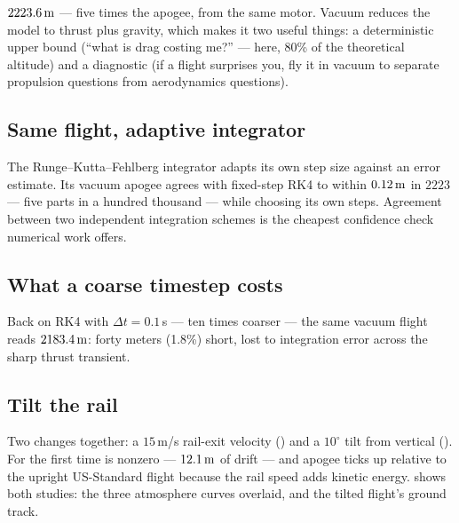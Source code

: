 

$2223.6\,\mathrm{m}$ --- five times the apogee, from the same motor. Vacuum reduces the
model to thrust plus gravity, which makes it two useful things: a
deterministic upper bound (``what is drag costing me?'' --- here, 80\% of the
theoretical altitude) and a diagnostic (if a flight surprises you, fly it in
vacuum to separate propulsion questions from aerodynamics questions).

\subsection*{Same flight, adaptive integrator}



The Runge--Kutta--Fehlberg integrator adapts its own step size against an
error estimate. Its vacuum apogee agrees with fixed-step RK4 to within
$0.12\,\mathrm{m}$ in $2223$ --- five parts in a hundred thousand --- while choosing its
own steps. Agreement between two independent integration schemes is the
cheapest confidence check numerical work offers.

\subsection*{What a coarse timestep costs}



Back on RK4 with $\Delta t = 0.1$\,s --- ten times coarser --- the same vacuum
flight reads $2183.4\,\mathrm{m}$: forty meters (1.8\%) short, lost to integration error
across the sharp thrust transient.

\subsection*{Tilt the rail}



Two changes together: a $15$\,m/s rail-exit velocity () and
a $10^\circ$ tilt from vertical (). For the first time
 is nonzero --- $12.1\,\mathrm{m}$ of drift --- and apogee ticks up
relative to the upright US-Standard flight because the rail speed adds kinetic
energy.  shows both studies: the three atmosphere curves
overlaid, and the tilted flight's ground track.

